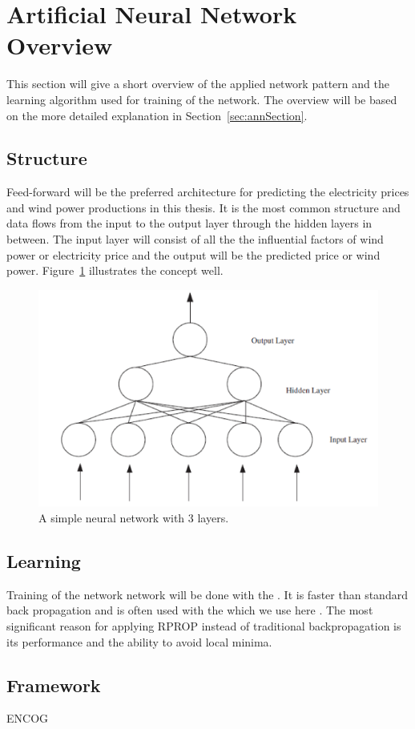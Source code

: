 \section{Artificial Neural Network Overview}
This section will give a short overview of the applied network pattern and the learning algorithm used for training of the network. The overview will be based on the more detailed explanation in Section~\ref{sec:annSection}.

\subsection{Structure}
Feed-forward will be the preferred architecture for predicting the electricity prices and wind power productions in this thesis. It is the most common structure and data flows from the input to the output layer through the hidden layers in between. The input layer will consist of all the the influential factors of wind power or electricity price and the output will be the predicted price or wind power. Figure~\ref{fig:overviewAnn} illustrates the concept well.

\begin{figure}[H]
\centering
\includegraphics[width=0.8\linewidth]{billeder/ANN.png}
\caption{A simple neural network with 3 layers. \cite{stockForecasting}}
\label{fig:overviewAnn}
\end{figure}

\subsection{Learning}
Training of the network network will be done with the . It is faster than standard back propagation \cite{15} and is often used with the  which we use here \cite{17}. The most significant reason for applying RPROP instead of traditional backpropagation is its performance and the ability to avoid local minima.

\subsection{Framework}
ENCOG 